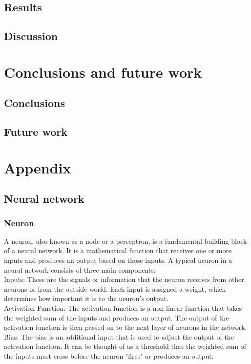 \documentclass[a4paper]{sapthesis}
\begin{document}
\section{Results}
\section{Discussion}
\chapter{Conclusions and future work}
\section{Conclusions}
\section{Future work}
\chapter{Appendix}
\section {Neural network}
\subsection{Neuron}\label{sec:neuron}
A neuron, also known as a node or a perceptron, is a fundamental building
 block of a neural network. It is a mathematical function that receives one
or more inputs and produces an output based on those inputs. \newline 
A typical neuron in a neural network consists of three main components:\newline \\
Inputs: These are the signals or information that the neuron receives from 
other neurons or from the outside world.
 Each input is assigned a weight, which determines how important it is 
 to the neuron's output. \newline \\
Activation Function: The activation function is a non-linear function 
that takes the weighted sum of the inputs and produces an output. 
The output of the activation function is then passed on to the next 
layer of neurons in the network.\newline \\
Bias: The bias is an additional input that is used to adjust the output 
of the activation function. It can be thought of as a threshold that the 
weighted sum of the inputs must cross before the neuron "fires" or 
produces an output.
\end{document}
